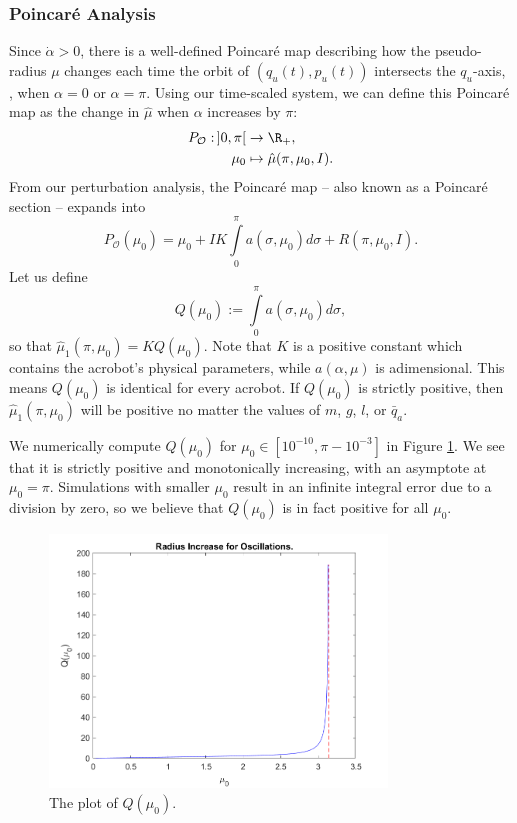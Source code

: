 \subsubsection{Poincar\'{e} Analysis}

Since \(\dot{\alpha} > 0\), there is a well-defined Poincar\'{e} map 
describing how the pseudo-radius \(\mu\) changes each time the orbit of \((q_u(t),p_u(t))\)
intersects the \(q_u\)-axis, \ie, when \(\alpha = 0\) or \(\alpha = \pi\).
Using our time-scaled system, we can define this Poincar\'{e} map as the change
in \(\hat{\mu}\) when \(\alpha\) increases by \(\pi\):
\begin{align*}
    P_\mathcal{O} : \,]0,\pi[ &\rightarrow \R_+,
    \\
    \mu_0 &\mapsto \hat{\mu}(\pi,\mu_0,I)
    .
\end{align*}
From our perturbation analysis, the Poincar\'{e} map -- also known as a
Poincar\'{e} section --  expands into
\[
    P_\mathcal{O}(\mu_0) = \mu_0 + I K \int\limits_0^\pi a(\sigma,\mu_0)d\sigma
    + R(\pi,\mu_0,I)
    .
\]
Let us define
\[
    Q(\mu_0) := \int \limits_0^\pi a(\sigma,\mu_0)d\sigma
    ,
\]
so that \(\hat{\mu}_1(\pi,\mu_0) = K Q(\mu_0)\).
Note that \(K\) is a positive constant which contains the acrobot's physical
parameters, while \(a(\alpha,\mu)\) is adimensional. 
This means \(Q(\mu_0)\) is identical for every acrobot.
If \(Q(\mu_0)\) is strictly positive, then \(\hat{\mu}_1(\pi,\mu_0)\) will be
positive no matter the values of \(m\), \(g\), \(l\), or \(\bar{q}_a\).

We numerically compute \(Q(\mu_0)\) for \(\mu_0 \in [10^{-10}, \pi - 10^{-3}]\)
in Figure \ref{fig:acrobot-Q}. 
We see that it is strictly positive and monotonically increasing, with
an asymptote at \(\mu_0 = \pi\). 
Simulations with smaller \(\mu_0\) result in an infinite integral error due
to a division by zero, so we believe that \(Q(\mu_0)\) is in fact positive for
all \(\mu_0\).

\begin{figure}
    \centering
    \includegraphics[width=0.8\textwidth]{images/Qmu.png}
    \caption{The plot of \(Q(\mu_0)\).}
    \label{fig:acrobot-Q}
\end{figure}

